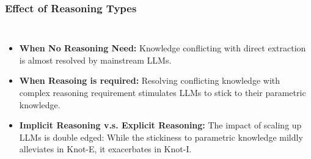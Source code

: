 \documentclass{beamer}
\begin{document}
\begin{frame}
    \frametitle{Effect of Reasoning Types}
    \begin{columns}[t]
        \begin{itemize}
            \item \textbf{ When No Reasoning Need:} Knowledge conflicting with direct extraction
            is almost resolved by mainstream LLMs.
            \item \textbf{ When Reasoing is required:} Resolving conflicting knowledge with complex reasoning requirement stimulates LLMs to stick to their parametric knowledge.
            \item \textbf{Implicit Reasoning v.s. Explicit Reasoning:} The impact of scaling up LLMs is double edged: While the stickiness to parametric knowledge mildly alleviates in Knot-E, it exacerbates in Knot-I.
        \end{itemize}
        


\end{columns}
\end{frame}
\end{document}
